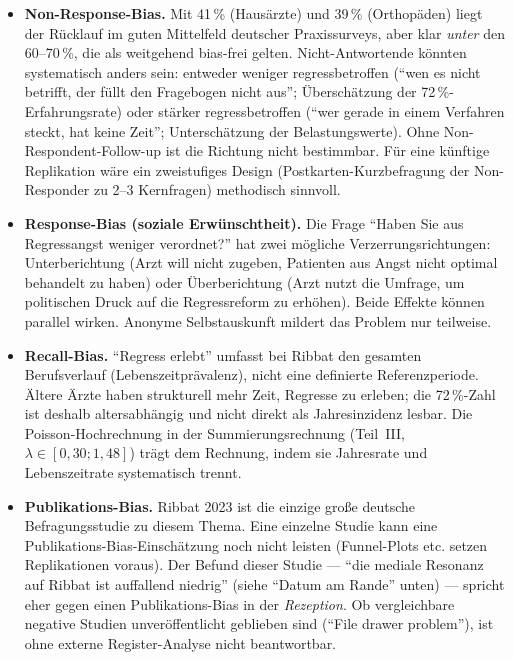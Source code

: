 \documentclass{umbruch-position}
\begin{document}
\begin{itemize}[nosep]
  \item \textbf{Non-Response-Bias.} Mit 41\,\% (Hausärzte) und 39\,\% (Orthopäden) liegt der Rücklauf im guten Mittelfeld deutscher Praxis\-surveys, aber klar \textit{unter} den 60--70\,\%, die als weitgehend bias-frei gelten. Nicht-Antwortende könnten systematisch anders sein: entweder weniger regress\-betroffen (``wen es nicht betrifft, der füllt den Fragebogen nicht aus''; Überschätzung der 72\,\%-Erfahrungs\-rate) oder stärker regress\-betroffen (``wer gerade in einem Verfahren steckt, hat keine Zeit''; Unterschätzung der Belastungs\-werte). Ohne Non-Respondent-Follow-up ist die Richtung nicht bestimmbar. Für eine künftige Replikation wäre ein zweistufiges Design (Postkarten-Kurzbefragung der Non-Responder zu 2--3 Kernfragen) methodisch sinnvoll.
  \item \textbf{Response-Bias (soziale Erwünschtheit).} Die Frage ``Haben Sie aus Regressangst weniger verordnet?'' hat zwei mögliche Verzerrungs\-richtungen: Unterberichtung (Arzt will nicht zugeben, Patienten aus Angst nicht optimal behandelt zu haben) oder Überberichtung (Arzt nutzt die Umfrage, um politischen Druck auf die Regress\-reform zu erhöhen). Beide Effekte können parallel wirken. Anonyme Selbst\-auskunft mildert das Problem nur teilweise.
  \item \textbf{Recall-Bias.} ``Regress erlebt'' umfasst bei Ribbat den gesamten Berufsverlauf (Lebenszeit\-prävalenz), nicht eine definierte Referenz\-periode. Ältere Ärzte haben strukturell mehr Zeit, Regresse zu erleben; die 72\,\%-Zahl ist deshalb altersabhängig und nicht direkt als Jahres\-inzidenz lesbar. Die Poisson-Hochrechnung in der Summierungsrechnung (Teil~III, $\lambda \in [0{,}30; 1{,}48]$) trägt dem Rechnung, indem sie Jahres\-rate und Lebens\-zeit\-rate systematisch trennt.
  \item \textbf{Publikations-Bias.} Ribbat 2023 ist die einzige große deutsche Befragungs\-studie zu diesem Thema. Eine einzelne Studie kann eine Publikations-Bias-Einschätzung noch nicht leisten (Funnel-Plots etc. setzen Replikationen voraus). Der Befund dieser Studie --- ``die mediale Resonanz auf Ribbat ist auffallend niedrig'' (siehe ``Datum am Rande'' unten) --- spricht eher gegen einen Publikations-Bias in der \textit{Rezeption}. Ob vergleichbare negative Studien unveröffentlicht geblieben sind (``File drawer problem''), ist ohne externe Register-Analyse nicht beantwortbar.
\end{itemize}
\end{document}
